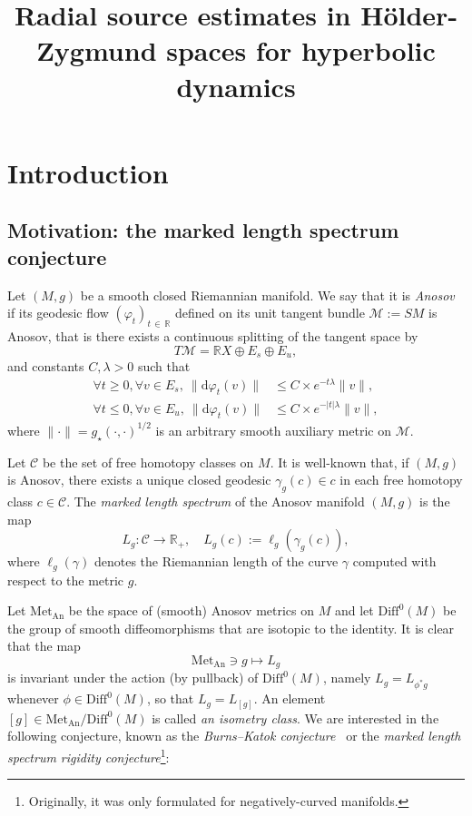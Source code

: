\documentclass[AHL,Unicode,longabstracts,published]{cedram}
\title[Radial source estimates in H\"older-Zygmund spaces]{Radial source estimates in H\"older-Zygmund spaces for hyperbolic dynamics}
\author[Y. Guedes Bonthonneau]{\firstname{Yannick} \lastname{Guedes Bonthonneau}}
\author[T.~Lefeuvre]{\firstname{Thibault} \lastname{Lefeuvre}}
\newcommand{\R}{\mathbb{R}}
\newcommand{\mc}{\mathcal}
\newcommand{\M}{\mathcal{M}}
\newcommand{\dd}{\mathrm{d}}
\newcommand{\Met}{\mathrm{Met}}
\newcommand{\An}{\mathrm{An}}
\newcommand{\Diff}{\mathrm{Diff}}
\let\oldforall\forall
\renewcommand*{\forall}{\mathrel{\oldforall}}
\begin{document}
\maketitle



\section{Introduction}

\subsection{Motivation: the marked length spectrum conjecture}

Let $(M,g)$ be a smooth closed Riemannian manifold. We say that it is \emph{Anosov} if its geodesic flow $(\varphi_t)_{t\,\in\,\R}$ defined on its unit tangent bundle $\M := SM$ is Anosov, that is there exists a continuous splitting of the tangent space by
\[
T\M = \R X \oplus E_s \oplus E_u,
\]
and constants $C,\lambda>0$ such that
\begin{equation}\label{equation:anosov}
\begin{split}
\forall t \geq 0, \forall v \in E_s, \ \|\dd\varphi_t(v)\| &\leq C\times e^{-t\lambda}\|v\|, \\
\forall t \leq 0, \forall v \in E_u, \ \|\dd\varphi_t(v)\| &\leq C\times e^{-|t|\lambda}\|v\|,
\end{split}
\end{equation}
where $\| \cdot \| = g_\star(\cdot,\cdot)^{1/2}$ is an arbitrary smooth auxiliary metric on $\M$.

Let $\mc{C}$ be the set of free homotopy classes on $M$. It is well-known that, if $(M,g)$ is Anosov, there exists a unique closed geodesic $\gamma_g(c) \in c$ in each free homotopy class $c \in \mc{C}$. The \emph{marked length spectrum} of the Anosov manifold $(M,g)$ is the map
\begin{equation}\label{equation:mls}
L_g : \mc{C} \rightarrow \R_+,\quad L_g(c) := \ell_g\left(\gamma_g(c)\right),
\end{equation}
where $\ell_g(\gamma)$ denotes the Riemannian length of the curve $\gamma$ computed with respect to the metric $g$.

Let $\Met_{\An}$ be the space of (smooth) Anosov metrics on $M$ and let $\Diff^0(M)$ be the group of smooth diffeomorphisms that are isotopic to the identity. It is clear that the map
\[
\Met_{\An} \ni g \mapsto L_{g}
\]
is invariant under the action (by pullback) of $\Diff^0(M)$, namely $L_g = L_{\phi^*g}$ whenever $\phi \in \Diff^0(M)$, so that $L_g = L_{[g]}$. An element $[g] \in \Met_{\An}/\Diff^0(M)$ is called \emph{an isometry class}. We are interested in the following conjecture, known as the \emph{Burns--Katok conjecture}~\cite{Burns-Katok-85} or the \emph{marked length spectrum rigidity conjecture}\footnote{Originally, it was only formulated for negatively-curved manifolds.}:
\end{document}

